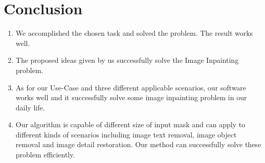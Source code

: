 \chapter{Conclusion}
\begin{enumerate}
	\item We accomplished the chosen task and solved the problem. The result works well.
	\item The proposed ideas given by us successfully solve the Image Inpainting problem.
	\item As for our Use-Case and three different applicable scenarios, our software works well and it successfully solve some image inpainting problem in our daily life. 
	\item Our algorithm is capable of different size of input mask and can apply to different kinds of scenarios including image text removal, image object removal and image detail restoration. Our method can successfully solve these problem efficiently.
\end{enumerate}

